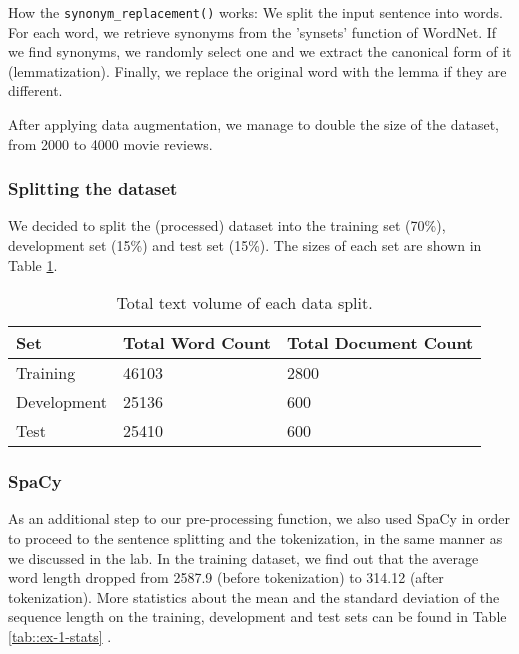 \documentclass[10pt, a4paper]{article}
\begin{document}
        How the \texttt{synonym\_replacement()} works: We split the input sentence into words. For each word, we retrieve synonyms from the 'synsets' function of WordNet. If we find synonyms, we randomly select one and we extract the canonical form of it (lemmatization). Finally, we replace the original word with the lemma if they are different.

        After applying data augmentation, we manage to double the size of the dataset, from 2000 to 4000 movie reviews. 

        
	
	\subsubsection{Splitting the dataset}
	We decided to split the (processed) dataset into the training set (70\%), development set (15\%) and test set (15\%). The sizes of each set are shown in Table \ref{tab::ex-9-stats}.
	
	\begin{table}
		\begin{tabular}{|l|l|l|}
			\hline
			\cellcolor{blue!25}\textbf{Set} & \cellcolor{blue!25}\textbf{Total Word Count} &
			\cellcolor{blue!25}\textbf{Total Document Count}\\
			\hline
			Training & 46103 & 2800 \\\hline
			Development & 25136  & 600 \\\hline
			Test & 25410 & 600 \\\hline
		\end{tabular}
		\centering
		\caption{Total text volume of each data split.}
		\label{tab::ex-9-stats}
	\end{table}
	
	
	\subsubsection{SpaCy}
	As an additional step to our pre-processing function, we also used SpaCy in order to proceed to the sentence splitting and the tokenization, in the same manner as we discussed in the lab. In the training dataset, we find out that the average word length dropped from 2587.9 (before tokenization) to 314.12 (after tokenization). More statistics about the mean and the standard deviation of the sequence length on the training, development and test sets can be found in Table \ref{tab::ex-1-stats} .
	
\end{document}
